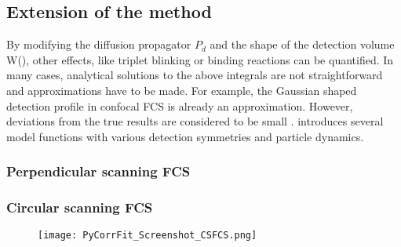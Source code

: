 \subsection{Extension of the method}
\label{sec:theor.exten}
By modifying the diffusion propagator $P_d$ and the shape of the detection volume W(), other effects, like triplet blinking or binding reactions can be quantified. In many cases, analytical solutions to the above integrals are not straightforward and approximations have to be made. For example, the Gaussian shaped detection profile in confocal FCS is already an approximation. However, deviations from the true results are considered to be small \cite{Zhang2007}.  introduces several model functions with various detection symmetries and particle dynamics.

\subsubsection{Perpendicular scanning FCS}
\label{sec:theor.exten.perpe}

\subsubsection{Circular scanning FCS}
\label{sec:theor.exten.circu}

\begin{figure}[h]
\centering
\texttt{[image: PyCorrFit\_Screenshot\_CSFCS.png]}
\end{figure}

